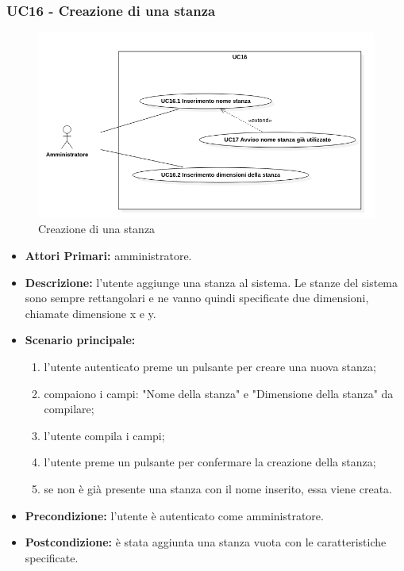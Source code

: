 \subsubsection{ UC16 - Creazione di una stanza}
\begin{figure}[H]
	\centering
	\includegraphics[width=18cm]{res/images/UC16Nuovo.png}
	\caption{Creazione di una stanza}
\end{figure}
\begin{itemize}
	\item\textbf{Attori Primari:}
	amministratore.
	\item\textbf{Descrizione:} 
	l'utente aggiunge una stanza al sistema. Le stanze del sistema sono sempre rettangolari e ne vanno quindi specificate due dimensioni, chiamate dimensione x e y.
	\item\textbf{Scenario principale:} 
	\begin{enumerate}
		\item l'utente autenticato preme un pulsante per creare una nuova stanza;
		\item compaiono i campi: "Nome della stanza" e "Dimensione della stanza" da compilare;
		\item l'utente compila i campi;
		\item l'utente preme un pulsante per confermare la creazione della stanza;
		\item se non è già presente una stanza con il nome inserito, essa viene creata.
	\end{enumerate}
	\item\textbf{Precondizione:} 
	l'utente è autenticato come amministratore.
	\item\textbf{Postcondizione:}
	è stata aggiunta una stanza vuota con le caratteristiche specificate.
\end{itemize}
